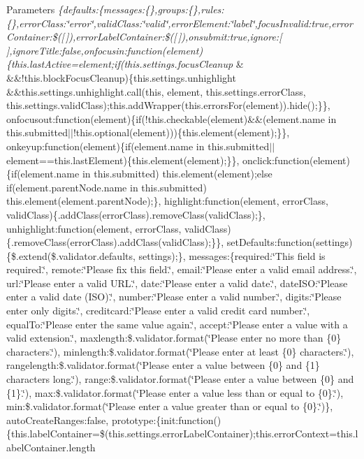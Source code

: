 \begin{DoxyParams}{Parameters}
{\em \{defaults\+:\{messages\+:\{\},groups\+:\{\},rules\+:\{\},error\+Class\+:\char`\"{}error\char`\"{},valid\+Class\+:\char`\"{}valid\char`\"{},error\+Element\+:\char`\"{}label\char`\"{},focus\+Invalid\+:true,error\+Container\+:\$(\mbox{[}$\,$\mbox{]}),error\+Label\+Container\+:\$(\mbox{[}$\,$\mbox{]}),onsubmit\+:true,ignore\+:\mbox{[}$\,$\mbox{]},ignore\+Title\+:false,onfocusin\+:function(element)\{this.\+last\+Active=element;if(this.\+settings.\+focus\+Cleanup} & \&\&!this.block\+Focus\+Cleanup)\{this.\+settings.\+unhighlight \&\&this.\+settings.\+unhighlight.\+call(this, element, this.\+settings.\+error\+Class, this.\+settings.\+valid\+Class);this.\+add\+Wrapper(this.\+errors\+For(element)).hide();\}\}, onfocusout\+:function(element)\{if(!this.checkable(element)\&\&(element.\+name in this.\+submitted$\vert$$\vert$!this.optional(element)))\{this.\+element(element);\}\}, onkeyup\+:function(element)\{if(element.\+name in this.\+submitted$\vert$$\vert$element==this.\+last\+Element)\{this.\+element(element);\}\}, onclick\+:function(element)\{if(element.\+name in this.\+submitted) this.\+element(element);else if(element.\+parent\+Node.\+name in this.\+submitted) this.\+element(element.\+parent\+Node);\}, highlight\+:function(element, error\+Class, valid\+Class)\{.add\+Class(error\+Class).remove\+Class(valid\+Class);\}, unhighlight\+:function(element, error\+Class, valid\+Class)\{.remove\+Class(error\+Class).add\+Class(valid\+Class);\}\}, set\+Defaults\+:function(settings)\{\$.extend(\$.validator.\+defaults, settings);\}, messages\+:\{required\+:\char`\"{}\+This field is required.\char`\"{}, remote\+:\char`\"{}\+Please fix this field.\char`\"{}, email\+:\char`\"{}\+Please enter a valid email address.\char`\"{}, url\+:\char`\"{}\+Please enter a valid U\+R\+L.\char`\"{}, date\+:\char`\"{}\+Please enter a valid date.\char`\"{}, date\+I\+S\+O\+:\char`\"{}\+Please enter a valid date (\+I\+S\+O).\char`\"{}, number\+:\char`\"{}\+Please enter a valid number.\char`\"{}, digits\+:\char`\"{}\+Please enter only digits.\char`\"{}, creditcard\+:\char`\"{}\+Please enter a valid credit card number.\char`\"{}, equal\+To\+:\char`\"{}\+Please enter the same value again.\char`\"{}, accept\+:\char`\"{}\+Please enter a value with a valid extension.\char`\"{}, maxlength\+:\$.validator.\+format(\char`\"{}\+Please enter no more than \{0\} characters.\char`\"{}), minlength\+:\$.validator.\+format(\char`\"{}\+Please enter at least \{0\} characters.\char`\"{}), rangelength\+:\$.validator.\+format(\char`\"{}\+Please enter a value between \{0\} and \{1\} characters long.\char`\"{}), range\+:\$.validator.\+format(\char`\"{}\+Please enter a value between \{0\} and \{1\}.\char`\"{}), max\+:\$.validator.\+format(\char`\"{}\+Please enter a value less than or equal to \{0\}.\char`\"{}), min\+:\$.validator.\+format(\char`\"{}\+Please enter a value greater than or equal to \{0\}.\char`\"{})\}, auto\+Create\+Ranges\+:false, prototype\+:\{init\+:function()\{this.\+label\+Container=\$(this.\+settings.\+error\+Label\+Container);this.\+error\+Context=this.\+label\+Container.\+length 
\end{DoxyParams}
